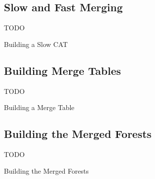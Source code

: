 \documentclass[10pt,twocolumn,twoside]{IEEEtran}
\begin{document}
\subsection{Slow and Fast Merging}

TODO

\begin{stulisting}[t]
\caption{Building a Slow CAT}
\label{code:build-slow-cat}

\end{stulisting}

\subsection{Building Merge Tables}

TODO

\begin{stulisting}[t]
\caption{Building a Merge Table}
\label{code:build-merge-table}

\end{stulisting}

\IEEEpubidadjcol

\subsection{Building the Merged Forests}

TODO

\begin{stulisting}[t]
\caption{Building the Merged Forests}
\label{code:build-merged-forest}

\end{stulisting}
\end{document}
